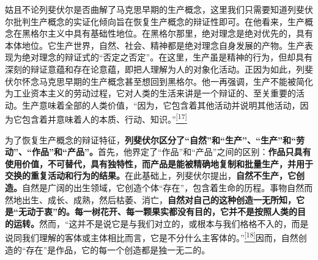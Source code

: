 \documentclass[UTF8, fontset = sourcesans, a4paper, oneside, zihao =
-4, scheme=chinese, no-math, space=true]{ctexbook}
\begin{document}
姑且不论列斐伏尔是否曲解了马克思早期的生产概念，这里我们只需要知道列斐伏尔批判生产概念的实证化倾向旨在恢复生产概念的辩证性即可。在他看来，生产概念在黑格尔主义中具有基础性地位。在黑格尔那里，绝对理念是绝对优先的，具有本体地位。它生产世界，自然、社会、精神都是绝对理念自身发展的产物。生产表现为绝对理念的辩证式的``否定之否定''。在这里，生产虽是精神的行为，但却具有深刻的辩证意蕴和存在论意蕴，即把人理解为人的对象化活动。正因为如此，列斐伏尔怀念马克思早期的生产概念甚至想回到黑格尔。他一再强调，生产不能被简化为工业资本主义的劳动过程，它对人类的生活来讲是一个辩证的、至关重要的活动。生产意味着全部的人类价值，``因为，它包含着其他活动并说明其他活动，因为它包含着并意味着人的本质、行动、知识。''\protect\hypertarget{part0006_split_002.htmlux5cux23w17}{}{}\protect\hyperlink{part0006_split_003.htmlux5cux23m17}{\textsuperscript{{[}17{]}}}

为了恢复生产概念的辩证特征，\textbf{列斐伏尔区分了``自然''和``生产''、``生产''和``劳动''、``作品''和``产品''。}首先，他界定了``作品''和``产品''之间的区别：\textbf{作品只具有使用价值，不可替代，具有独特性，而产品是能被精确地复制和批量生产，并用于交换的重复活动和行为的结果。}在此基础上，列斐伏尔提出，\textbf{自然不生产，它创造。}自然是广阔的出生领域，它创造个体``存在''，包含着生命的历程。事物自然而然地出生、成长、成熟，然后枯萎、消亡，\textbf{自然对自己的这种创造一无所知，它是``无动于衷''的。每一树花开、每一颗果实都没有目的，它并不是按照人类的目的运转。}然而，``这并不是说它是与我们对立的，或根本与我们格格不入的，而是说同我们理解的客体或主体相比而言，它是不分什么主客体的。''\protect\hypertarget{part0006_split_002.htmlux5cux23w18}{}{}\protect\hyperlink{part0006_split_003.htmlux5cux23m18}{\textsuperscript{{[}18{]}}}因而，自然创造的``存在''是作品，它的每一个创造都是独一无二的。
\end{document}
